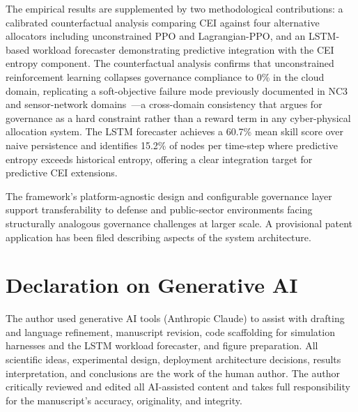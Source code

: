 \documentclass[runningheads]{llncs}
\begin{document}
The empirical results are supplemented by two methodological contributions: a calibrated counterfactual analysis comparing CEI against four alternative allocators including unconstrained PPO and Lagrangian-PPO, and an LSTM-based workload forecaster demonstrating predictive integration with the CEI entropy component. The counterfactual analysis confirms that unconstrained reinforcement learning collapses governance compliance to 0\% in the cloud domain, replicating a soft-objective failure mode previously documented in NC3 and sensor-network domains~\cite{paper1,paper2}---a cross-domain consistency that argues for governance as a hard constraint rather than a reward term in any cyber-physical allocation system. The LSTM forecaster achieves a 60.7\% mean skill score over naive persistence and identifies 15.2\% of nodes per time-step where predictive entropy exceeds historical entropy, offering a clear integration target for predictive CEI extensions.

The framework's platform-agnostic design and configurable governance layer support transferability to defense and public-sector environments facing structurally analogous governance challenges at larger scale. A provisional patent application has been filed describing aspects of the system architecture.

\section*{Declaration on Generative AI}
The author used generative AI tools (Anthropic Claude) to assist with drafting and language refinement, manuscript revision, code scaffolding for simulation harnesses and the LSTM workload forecaster, and figure preparation. All scientific ideas, experimental design, deployment architecture decisions, results interpretation, and conclusions are the work of the human author. The author critically reviewed and edited all AI-assisted content and takes full responsibility for the manuscript's accuracy, originality, and integrity.
\end{document}

